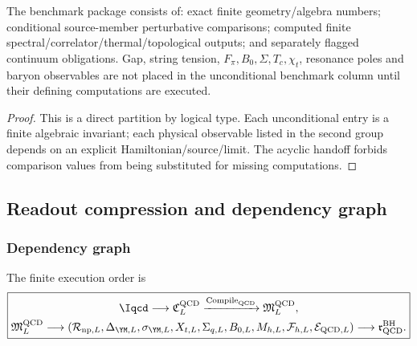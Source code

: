 \documentclass[12pt,a4paper]{article}
\begin{document}
\begin{proposition}
\label{p11:prop:finite-qcd-benchmark-package}

The benchmark package consists of: exact finite geometry/algebra numbers; conditional source-member perturbative comparisons; computed finite spectral/correlator/thermal/topological outputs; and separately flagged continuum obligations.  Gap, string tension, \(F_\pi,B_0,\Sigma,T_c,\chi_t\), resonance poles and baryon observables are not placed in the unconditional benchmark column until their defining computations are executed.
\label{p11:eq:finite-benchmark-set}
\label{p11:tab:finite-qcd-benchmark-package}
\end{proposition}
\begin{proof}

This is a direct partition by logical type.  Each unconditional entry is a finite algebraic invariant; each physical observable listed in the second group depends on an explicit Hamiltonian/source/limit.  The acyclic handoff forbids comparison values from being substituted for missing computations.
\end{proof}



\subsection{Readout compression and dependency graph}
\label{p11:sec:readout-compression-dependency-graph}


\subsubsection{Dependency graph}
\label{p11:subsec:dependency-graph-forbidden-comparison-arrows}


The finite execution order is
\begin{equation}
\label{p11:eq:qcd-dependency-graph}
\boxed{\begin{gathered}
\Iqcd\longrightarrow\mathfrak C_L^{\rm QCD}
\xrightarrow{\operatorname{Compile}_{\rm QCD}}
\mathfrak M_L^{\rm QCD},\\
\mathfrak M_L^{\rm QCD}
\longrightarrow
\left(\mathcal R_{{\rm np},L},\Delta_{\YM,L},\sigma_{\YM,L},X_{t,L},
\Sigma_{q,L},B_{0,L},M_{h,L},\mathcal F_{h,L},\mathcal E_{{\rm QCD},L}\right)
\longrightarrow\mathfrak r_{\rm QCD}^{\rm BH}.
\end{gathered}}
\end{equation}
\end{document}

